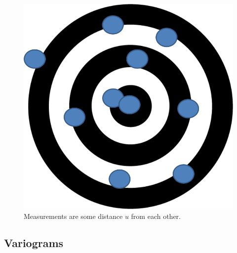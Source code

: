 \documentclass{beamer}
\begin{document}
\begin{frame}
  	\begin{figure}
	\centering
		\includegraphics[scale = 0.75]{Images/BullsEyeCovariance.png}
		\caption{ { \scriptsize Measurements are some distance $u$ from each other.}}
	\end{figure}
\end{frame}

\subsection{Variograms}

\end{document}
